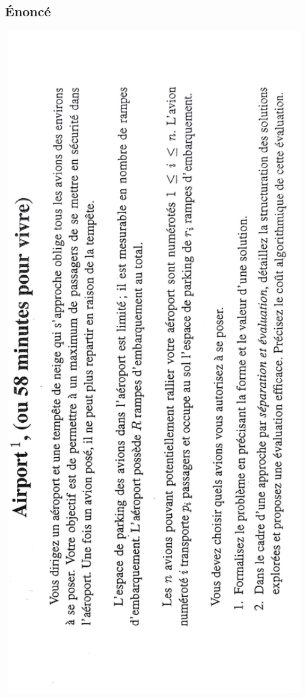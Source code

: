 \documentclass[11pt,a4paper]{article}
\begin{document}
	\subsection{Énoncé}
	\includegraphics[angle=-90,width=0.99\textwidth]{airport.jpg}
	\newpage
\end{document}
